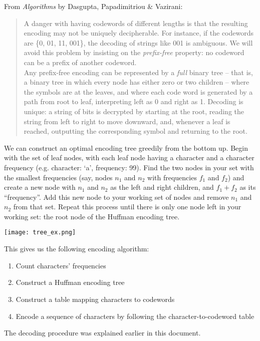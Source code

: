 \documentclass[11pt]{article}
\begin{document}
From \emph{Algorithms} by Dasgupta, Papadimitriou \& Vazirani:
\begin{quotation}
\noindent A danger with having codewords of different lengths is that the resulting encoding may not be uniquely decipherable. For instance, if the codewords are \{0, 01, 11, 001\}, the decoding of strings like 001 is ambiguous. We will avoid this problem by insisting on the \emph{prefix-free} property: no codeword can be a prefix of another codeword. \\

\noindent Any prefix-free encoding can be represented by a \emph{full} binary tree -- that is, a binary tree in which every node has either zero or two children -- where the symbols are at the leaves, and where each code word is generated by a path from root to leaf, interpreting left as 0 and right as 1. Decoding is unique: a string of bits is decrypted by starting at the root, reading the string from left to right to move downward, and, whenever a leaf is reached, outputting the corresponding symbol and returning to the root.
\end{quotation}

We can construct an optimal encoding tree greedily from the bottom up. Begin with the set of leaf nodes, with each leaf node having a character and a character frequency (e.g. character: `a', frequency: 99). Find the two nodes in your set with the smallest frequencies (say, nodes $n_1$ and $n_2$ with frequencies $f_1$ and $f_2$) and create a new node with $n_1$ and $n_2$ as the left and right children, and $f_1 + f_2$ as its ``frequency''. Add this new node to your working set of nodes and remove $n_1$ and $n_2$ from that set. Repeat this process until there is only one node left in your working set: the root node of the Huffman encoding tree.

\noindent \texttt{[image: tree\_ex.png]}

This gives  us the following encoding algorithm:
\begin{enumerate}[1.]
\item Count characters' frequencies
\item Construct a Huffman encoding tree
\item Construct a table mapping characters to codewords
\item Encode a sequence of characters by following the character-to-codeword table
\end{enumerate}

The decoding procedure was explained earlier in this document.
\end{document}
